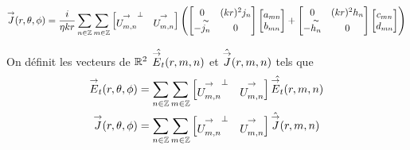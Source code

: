         \begin{equation}
            {\overset{\rightarrow}{J}}(r,\theta,\phi) = \dfrac{i}{\eta kr}\sum_{n\in\mathbb Z}\sum_{m\in\mathbb Z}
            \begin{bmatrix}
                {\overset{\rightarrow}{U_{m,n}^{{}}}}^\perp & {\overset{\rightarrow}{U_{m,n}^{{}}}}
            \end{bmatrix}
            \left(
                \begin{bmatrix}
                    0 & (kr)^2 j_n
                    \\
                    -\overset{\thicksim}{j_n} & 0
                \end{bmatrix}
                \begin{bmatrix}
                    a_{mn}
                    \\
                    b_{mn}
                \end{bmatrix}
                +
                \begin{bmatrix}
                    0 & (kr)^2 h_n
                    \\
                    -\overset{\thicksim}{h_n} & 0
                \end{bmatrix}
                \begin{bmatrix}
                    c_{mn}
                    \\
                    d_{mn}
                \end{bmatrix}
            \right)
        \end{equation}

        \begin{defn}
            On définit les vecteurs de \(\mathbb R^2\) \(\hat{{\overset{\rightarrow}{E}}_t}(r,m,n)\) et \(\hat{{\overset{\rightarrow}{J}}}(r,m,n)\) tels que
            \begin{align}
                {\overset{\rightarrow}{E}}_t(r,\theta,\phi) &= \sum_{n\in\mathbb Z}\sum_{m\in\mathbb Z}
                \begin{bmatrix}
                  {\overset{\rightarrow}{U_{m,n}^{{}}}}^\perp & {\overset{\rightarrow}{U_{m,n}^{{}}}}
                \end{bmatrix}\hat{{\overset{\rightarrow}{E}}_t}(r,m,n)
                \\
                {\overset{\rightarrow}{J}}(r,\theta,\phi) &= \sum_{n\in\mathbb Z}\sum_{m\in\mathbb Z}
                \begin{bmatrix}
                  {\overset{\rightarrow}{U_{m,n}^{{}}}}^\perp & {\overset{\rightarrow}{U_{m,n}^{{}}}}
                \end{bmatrix}\hat{{\overset{\rightarrow}{J}}}(r,m,n)
            \end{align}
        \end{defn}

